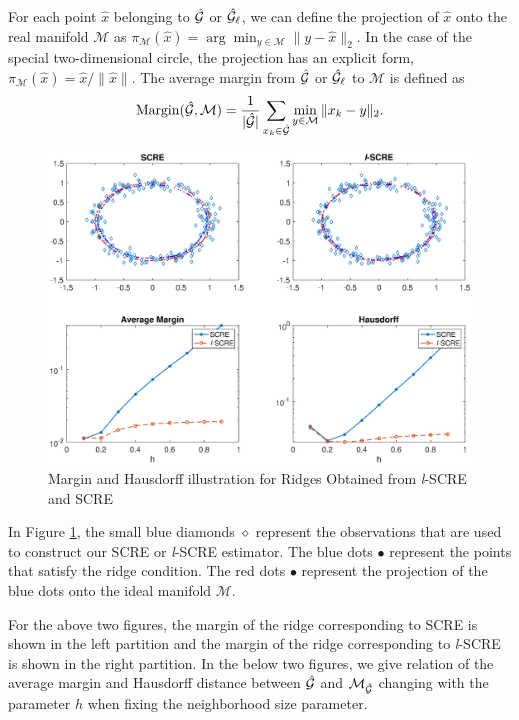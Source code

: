 \documentclass[aos,preprint]{imsart}
\theoremstyle{remark}
\begin{document}
For each point $\hat{x}$ belonging to ${\cal \hat{G}}$ or ${\cal \hat{G}}_\ell$, we can define the projection of $\hat{x}$ onto the real manifold $\mathcal M$ as $\pi_{\mathcal M}(\hat{x}) = \arg\min_{y\in \mathcal M} \|y-\hat{x}\|_2$. In the case of the special two-dimensional circle, the projection has an explicit form, $\pi_{\mathcal M}(\hat{x}) = \hat{x}/\|\hat{x}\|$. The average margin from $\cal \hat{G}$ or ${ \cal \hat{G}}_\ell$ to $\mathcal M$ is defined as
\[
{\rm Margin}({ \cal \hat{G}, \mathcal M}) =\frac{1}{|{\cal \hat{G}}|}  \sum_{x_k\in  {\cal \hat{G}}} \min_{y\in \mathcal M}\|x_k-y\|_2.
\]
\begin{figure}[t] %
   \includegraphics[width=\linewidth]{circle8.eps} 
   \vspace{-1cm}
   \caption{Margin and Hausdorff illustration for Ridges Obtained from {\it l}-SCRE and SCRE}
   \label{fig:circle6}
\end{figure}

In Figure \ref{fig:circle6}, the small blue diamonds $\diamond$ represent the observations that are used to construct our SCRE or {\it l}-SCRE estimator. The blue dots $\bullet$ represent the points that satisfy the ridge condition. The red dots $\bullet$ represent the projection of the blue dots onto the ideal manifold ${\mathcal M}$. 

For the above two figures, the margin of the ridge corresponding to SCRE is shown in the left partition and the margin of the ridge corresponding to {\it l}-SCRE is shown in the right partition. 
In the below two figures, we give relation of  the average margin and Hausdorff distance between $\cal \hat{G}$ and ${\cal M}_{\cal \hat{G}}$ changing with the parameter $h$ when fixing the neighborhood size parameter.
\end{document}
